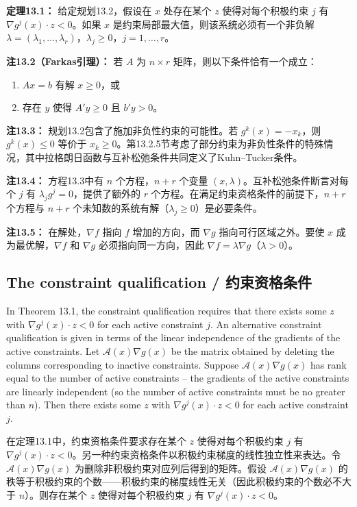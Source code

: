 \begin{translation}
\textbf{定理13.1：} 给定规划13.2，假设在 $x$ 处存在某个 $z$ 使得对每个积极约束 $j$ 有 $\nabla g^j(x) \cdot z < 0$。如果 $x$ 是约束局部最大值，则该系统必须有一个非负解 $\lambda = (\lambda_1,\dots,\lambda_r)$，$\lambda_j \ge 0$，$j = 1,\dots, r$。

\textbf{注13.2（Farkas引理）：} 若 $A$ 为 $n \times r$ 矩阵，则以下条件恰有一个成立：
\begin{enumerate}
\item $Ax = b$ 有解 $x \ge 0$，或
\item 存在 $y$ 使得 $A'y \ge 0$ 且 $b'y > 0$。
\end{enumerate}

\textbf{注13.3：} 规划13.2包含了施加非负性约束的可能性。若 $g^k(x) = -x_k$，则 $g^k(x) \le 0$ 等价于 $x_k \ge 0$。第13.2.5节考虑了部分约束为非负性条件的特殊情况，其中拉格朗日函数与互补松弛条件共同定义了Kuhn--Tucker条件。

\textbf{注13.4：} 方程13.3中有 $n$ 个方程，$n+r$ 个变量 $(x,\lambda)$。互补松弛条件断言对每个 $j$ 有 $\lambda_j g^j = 0$，提供了额外的 $r$ 个方程。在满足约束资格条件的前提下，$n+r$ 个方程与 $n+r$ 个未知数的系统有解（$\lambda_j \ge 0$）是必要条件。

\textbf{注13.5：} 在解处，$\nabla f$ 指向 $f$ 增加的方向，而 $\nabla g$ 指向可行区域之外。要使 $x$ 成为最优解，$\nabla f$ 和 $\nabla g$ 必须指向同一方向，因此 $\nabla f = \lambda \nabla g$（$\lambda > 0$）。
\end{translation}

\subsection{The constraint qualification / 约束资格条件}

\begin{original}
In Theorem 13.1, the constraint qualification requires that there exists some $z$ with $\nabla g^j(x) \cdot z < 0$ for each active constraint $j$. An alternative constraint qualification is given in terms of the linear independence of the gradients of the active constraints. Let $\mathcal{A}(x)\nabla g(x)$ be the matrix obtained by deleting the columns corresponding to inactive constraints. Suppose $\mathcal{A}(x)\nabla g(x)$ has rank equal to the number of active constraints -- the gradients of the active constraints are linearly independent (so the number of active constraints must be no greater than $n$). Then there exists some $z$ with $\nabla g^j(x) \cdot z < 0$ for each active constraint $j$.
\end{original}
\begin{translation}
在定理13.1中，约束资格条件要求存在某个 $z$ 使得对每个积极约束 $j$ 有 $\nabla g^j(x) \cdot z < 0$。另一种约束资格条件以积极约束梯度的线性独立性来表达。令 $\mathcal{A}(x)\nabla g(x)$ 为删除非积极约束对应列后得到的矩阵。假设 $\mathcal{A}(x)\nabla g(x)$ 的秩等于积极约束的个数——积极约束的梯度线性无关（因此积极约束的个数必不大于 $n$）。则存在某个 $z$ 使得对每个积极约束 $j$ 有 $\nabla g^j(x) \cdot z < 0$。
\end{translation}

